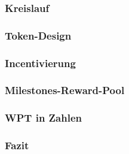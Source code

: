 \vspace{0.3cm}





\subsubsection{Kreislauf}
\label{sec:wpt_kreislauf}
\vspace{0.3cm}

\subsubsection{Token-Design}
\label{sec:wpt_design}
\vspace{0.3cm}

\subsubsection{Incentivierung}
\label{sec:wpt_incent}
\vspace{0.3cm}

\subsubsection{Milestones-Reward-Pool}
\label{sec:wpt_reward_pool}
\vspace{0.3cm}

\subsubsection{WPT in Zahlen}
\label{sec:wpt_zahlen}
\vspace{0.3cm}

\subsubsection{Fazit}
\label{sec:wpt_fazit}
